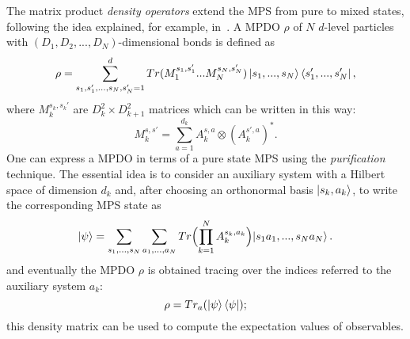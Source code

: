 The matrix product \emph{density operators} extend the MPS from pure to mixed states, following the idea explained, for example, in~\cite{PhysRevLett.93.207204}. A MPDO $\rho$ of $N$ $d$-level particles with $(D_1, D_2, ..., D_N)$-dimensional bonds is defined as
\begin{equation}
    \rho = \sum_{s_1,s_1', ... ,s_N,s_N' = 1}^{d} Tr(M_1^{s_1,s_1'} ... M_N^{s_N,s_N'}) \ket{s_1, ... ,s_N}\bra{s'_1, ... ,s'_N},
\end{equation}
where $M_k^{s_k,s_k'}$ are $D_k^2 \times D_{k+1}^2$ matrices which can be written in this way:
\begin{equation}
    M_k^{s,s'} = \sum_{a = 1}^{d_k} A_k^{s,a} \otimes (A_k^{s',a})^*.
\end{equation}
One can express a MPDO in terms of a pure state MPS using the \emph{purification}~\cite{nielsen_chuang} technique. The essential idea is to consider an auxiliary system with a Hilbert space of dimension $d_k$ and, after choosing an orthonormal basis $\ket{s_k, a_k}$, to write the corresponding MPS state as
\begin{equation}
    \ket{\psi} = \sum_{s_1,...,s_N} \sum_{a_1, ..., a_N} Tr\Bigl(\prod_{k=1}^N A_k^{s_k, a_k}\Bigl) \ket{s_1a_1, ..., s_Na_N}.
\end{equation}
and eventually the MPDO $\rho$ is obtained tracing over the indices referred to the auxiliary system $a_k$:
\begin{equation}
    \rho = Tr_a(\ket{\psi}\bra{\psi});
\end{equation}
this density matrix can be used to compute the expectation values of observables.




